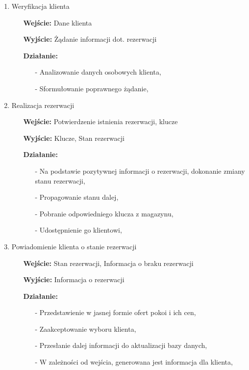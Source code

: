 \documentclass[a4paper, 11pt]{article}
\begin{document}
\begin{enumerate}[label*=\arabic*.]
\begin{enumerate}[label*=\arabic*.]
\begin{enumerate}[label*=\arabic*.]
				\item Weryfikacja klienta
				\begin{itemize}
					\item[\textbf{Wejście:}] Dane klienta
					\item[\textbf{Wyjście:}] Żądanie informacji dot. rezerwacji
					\item[\textbf{Działanie:}] 
					\begin{itemize}
						\item[-] Analizowanie danych osobowych klienta,
						\item[-] Sformułowanie poprawnego żądanie,
					\end{itemize}														
				\end{itemize}	
				\item Realizacja rezerwacji
				\begin{itemize}
					\item[\textbf{Wejście:}] Potwierdzenie istnienia rezerwacji, klucze
					\item[\textbf{Wyjście:}] Klucze, Stan rezerwacji
					\item[\textbf{Działanie:}] 
					\begin{itemize}
						\item[-] Na podstawie pozytywnej informacji o rezerwacji, dokonanie zmiany stanu rezerwacji,
						\item[-] Propagowanie stanu dalej,
						\item[-] Pobranie odpowiedniego klucza z magazynu,
						\item[-] Udostępnienie go klientowi,
					\end{itemize}														
				\end{itemize}	
				\item Powiadomienie klienta o stanie rezerwacji
				\begin{itemize}
					\item[\textbf{Wejście:}] Stan rezerwacji, Informacja o braku rezerwacji
					\item[\textbf{Wyjście:}] Informacja o rezerwacji
					\item[\textbf{Działanie:}] 
					\begin{itemize}
						\item[-] Przedstawienie w jasnej formie ofert pokoi i ich cen,
						\item[-] Zaakceptowanie wyboru klienta,
						\item[-] Przesłanie dalej informacji do aktualizacji bazy danych,
						\item[-] W zależności od wejścia, generowana jest informacja dla klienta,

\end{itemize}
\end{itemize}
\end{enumerate}
\end{enumerate}
\end{enumerate}
\end{document}
